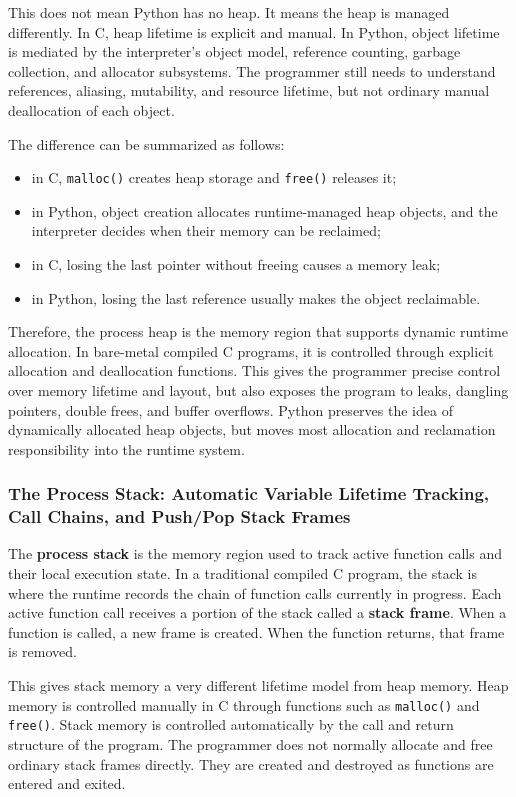 This does not mean Python has no heap. It means the heap is managed differently. In C, heap lifetime is explicit and manual. In Python, object lifetime is mediated by the interpreter's object model, reference counting, garbage collection, and allocator subsystems. The programmer still needs to understand references, aliasing, mutability, and resource lifetime, but not ordinary manual deallocation of each object.

The difference can be summarized as follows:

\begin{itemize}
    \item in C, \texttt{malloc()} creates heap storage and \texttt{free()} releases it;
    \item in Python, object creation allocates runtime-managed heap objects, and the interpreter decides when their memory can be reclaimed;
    \item in C, losing the last pointer without freeing causes a memory leak;
    \item in Python, losing the last reference usually makes the object reclaimable.
\end{itemize}

Therefore, the process heap is the memory region that supports dynamic runtime allocation. In bare-metal compiled C programs, it is controlled through explicit allocation and deallocation functions. This gives the programmer precise control over memory lifetime and layout, but also exposes the program to leaks, dangling pointers, double frees, and buffer overflows. Python preserves the idea of dynamically allocated heap objects, but moves most allocation and reclamation responsibility into the runtime system.

\subsubsection{The Process Stack: Automatic Variable Lifetime Tracking, Call Chains, and Push/Pop Stack Frames}

The \textbf{process stack} is the memory region used to track active function calls and their local execution state. In a traditional compiled C program, the stack is where the runtime records the chain of function calls currently in progress. Each active function call receives a portion of the stack called a \textbf{stack frame}. When a function is called, a new frame is created. When the function returns, that frame is removed.

This gives stack memory a very different lifetime model from heap memory. Heap memory is controlled manually in C through functions such as \texttt{malloc()} and \texttt{free()}. Stack memory is controlled automatically by the call and return structure of the program. The programmer does not normally allocate and free ordinary stack frames directly. They are created and destroyed as functions are entered and exited.

